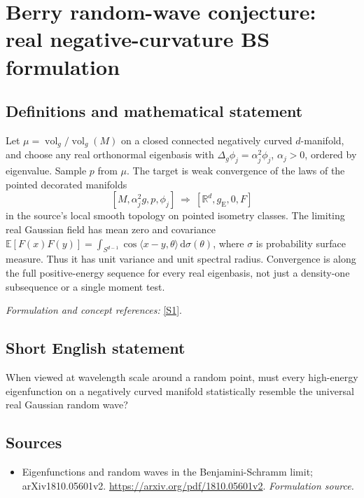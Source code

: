 \documentclass[11pt]{article}
\begin{document}
\section*{\texorpdfstring{Berry random-wave conjecture: real negative-curvature BS formulation}{Berry random-wave conjecture: real negative-curvature BS formulation}}\label{30006801}
\subsection{Definitions and mathematical statement}
Let $\mu=\operatorname{vol}_g/\operatorname{vol}_g(M)$ on a closed connected negatively curved $d$-manifold, and choose any real orthonormal eigenbasis with
$\Delta_g\phi_j=\alpha_j^2\phi_j$, $\alpha_j>0$, ordered by eigenvalue. Sample $p$ from $\mu$. The target is weak convergence of the laws of the pointed decorated manifolds
\[
 [M,\alpha_j^2g,p,\phi_j]\ \Longrightarrow\ [{\mathbb{R}}^d,g_{\mathrm E},0,F]
\]
in the source's local smooth topology on pointed isometry classes. The limiting real Gaussian field has mean zero and covariance
${\mathbb{E}}[F(x)F(y)]=\int_{S^{d-1}}\cos\langle x-y,\theta\rangle{\,\mathrm{d}}\sigma(\theta)$,
where $\sigma$ is probability surface measure. Thus it has unit variance and unit spectral radius. Convergence is along the full positive-energy sequence for every real eigenbasis, not just a density-one subsequence or a single moment test.
\par\smallskip\textit{Formulation and concept references:} \href{https://arxiv.org/pdf/1810.05601v2}{[S1]}.

\subsection{Short English statement}
When viewed at wavelength scale around a random point, must every high-energy eigenfunction on a negatively curved manifold statistically resemble the universal real Gaussian random wave?
\subsection{Sources}
\begin{itemize}
\item[S1]Eigenfunctions and random waves in the Benjamini-Schramm limit; arXiv1810.05601v2.
\url{https://arxiv.org/pdf/1810.05601v2}.
\textit{Formulation source.}
\end{itemize}
\end{document}
